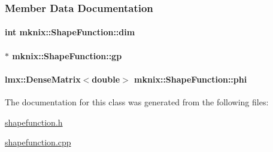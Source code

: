 \subsubsection{Member Data Documentation}
\hypertarget{classmknix_1_1_shape_function_a1ca9a4d7bc5f82c887ac7e9bdd54aa1e}{
\paragraph[{dim}]{\setlength{\rightskip}{0pt plus 5cm}int mknix\-::\-Shape\-Function\-::dim\hspace{0.3cm}{\ttfamily [protected]}}}\label{classmknix_1_1_shape_function_a1ca9a4d7bc5f82c887ac7e9bdd54aa1e}
\hypertarget{classmknix_1_1_shape_function_a70f36189e78b80d045076234e4c668da}{
\paragraph[{gp}]{$\ast$ mknix\-::\-Shape\-Function\-::gp\hspace{0.3cm}{\ttfamily [protected]}}}\label{classmknix_1_1_shape_function_a70f36189e78b80d045076234e4c668da}
\hypertarget{classmknix_1_1_shape_function_ac1eaf8c2e5d8d6abf4726eb416de13d9}{
\paragraph[{phi}]{\setlength{\rightskip}{0pt plus 5cm}lmx\-::\-Dense\-Matrix$<$double$>$ mknix\-::\-Shape\-Function\-::phi\hspace{0.3cm}{\ttfamily [protected]}}}\label{classmknix_1_1_shape_function_ac1eaf8c2e5d8d6abf4726eb416de13d9}


The documentation for this class was generated from the following files\-:\begin{DoxyCompactItemize}
\item 
\hyperlink{shapefunction_8h}{shapefunction.\-h}\item 
\hyperlink{shapefunction_8cpp}{shapefunction.\-cpp}\end{DoxyCompactItemize}
